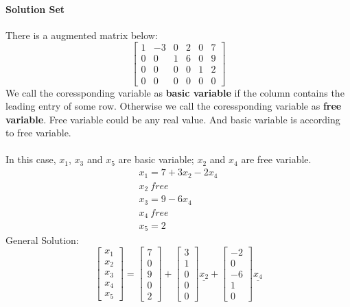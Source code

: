 \documentclass[14pt]{article}
\begin{document}
\begin{CJK}{UTF8}{min}
\paragraph{Solution Set}
There is a augmented matrix below:
\begin{equation}
\left[
\begin{array}{cccccc}
1 & -3 & 0 & 2 & 0 & 7 \\ 
0 & 0 & 1 & 6 & 0 & 9 \\
0 & 0 & 0 & 0 & 1 & 2 \\
0 & 0 & 0 & 0 & 0 & 0
\end{array}
\right]
\end{equation}
We call the coressponding variable as \textbf{basic variable} if the column contains the leading entry of some row. Otherwise we call the coressponding variable as \textbf{free variable}. Free variable could be any real value. And basic variable is according to free variable.\\\\
In this case, $x_1$, $x_3$ and $x_5$ are basic variable; $x_2$ and $x_4$ are free variable.
\begin{equation}
\begin{array}{l}
x_1=7+3x_2-2x_4 \\
x_2\ free \\
x_3=9-6x_4\\
x_4\ free\\
x_5=2
\end{array}
\end{equation}
General Solution:
\begin{equation}
\left[
\begin{array}{c}
x_1\\
x_2\\
x_3\\
x_4\\
x_5
\end{array}
\right]=
\left[
\begin{array}{c}
7\\
0\\
9\\
0\\
2
\end{array}
\right]
+
\left[
\begin{array}{c}
3\\
1\\
0\\
0\\
0
\end{array}
\right]\underline{x_2}
+
\left[
\begin{array}{c}
-2\\
0\\
-6\\
1\\
0
\end{array}
\right]\underline{x_4}
\end{equation}


\end{CJK}
\end{document}
